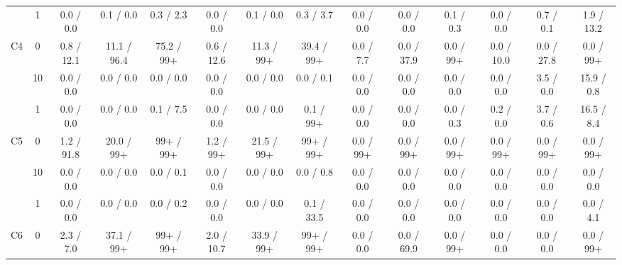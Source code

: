 \begin{table}
{\begin{tabular}[t]{cccccccccccccc}
\cmidrule{2-14}
 & 1 & 0.0 / 0.0 & 0.1 / 0.0 & 0.3 / 2.3 & 0.0 / 0.0 & 0.1 / 0.0 & 0.3 / 3.7 & 0.0 / 0.0 & 0.0 / 0.0 & 0.1 / 0.3 & 0.0 / 0.0 & 0.7 / 0.1 & 1.9 / 13.2\\
\cmidrule{2-14}
\multirow{-3}{*}{\centering\arraybackslash C4} & 0 & 0.8 / 12.1 & 11.1 / 96.4 & 75.2 / 99+ & 0.6 / 12.6 & 11.3 / 99+ & 39.4 / 99+ & 0.0 / 7.7 & 0.0 / 37.9 & 0.0 / 99+ & 0.0 / 10.0 & 0.0 / 27.8 & 0.0 / 99+\\
\cmidrule{1-14}
 & 10 & 0.0 / 0.0 & 0.0 / 0.0 & 0.0 / 0.0 & 0.0 / 0.0 & 0.0 / 0.0 & 0.0 / 0.1 & 0.0 / 0.0 & 0.0 / 0.0 & 0.0 / 0.0 & 0.0 / 0.0 & 3.5 / 0.0 & 15.9 / 0.8\\
\cmidrule{2-14}
 & 1 & 0.0 / 0.0 & 0.0 / 0.0 & 0.1 / 7.5 & 0.0 / 0.0 & 0.0 / 0.0 & 0.1 / 99+ & 0.0 / 0.0 & 0.0 / 0.0 & 0.0 / 0.3 & 0.2 / 0.0 & 3.7 / 0.6 & 16.5 / 8.4\\
\cmidrule{2-14}
\multirow{-3}{*}{\centering\arraybackslash C5} & 0 & 1.2 / 91.8 & 20.0 / 99+ & 99+ / 99+ & 1.2 / 99+ & 21.5 / 99+ & 99+ / 99+ & 0.0 / 99+ & 0.0 / 99+ & 0.0 / 99+ & 0.0 / 99+ & 0.0 / 99+ & 0.0 / 99+\\
\cmidrule{1-14}
 & 10 & 0.0 / 0.0 & 0.0 / 0.0 & 0.0 / 0.1 & 0.0 / 0.0 & 0.0 / 0.0 & 0.0 / 0.8 & 0.0 / 0.0 & 0.0 / 0.0 & 0.0 / 0.0 & 0.0 / 0.0 & 0.0 / 0.0 & 0.0 / 0.0\\
\cmidrule{2-14}
 & 1 & 0.0 / 0.0 & 0.0 / 0.0 & 0.0 / 0.2 & 0.0 / 0.0 & 0.0 / 0.0 & 0.1 / 33.5 & 0.0 / 0.0 & 0.0 / 0.0 & 0.0 / 0.0 & 0.0 / 0.0 & 0.0 / 0.0 & 0.0 / 4.1\\
\cmidrule{2-14}
\multirow{-3}{*}{\centering\arraybackslash C6} & 0 & 2.3 / 7.0 & 37.1 / 99+ & 99+ / 99+ & 2.0 / 10.7 & 33.9 / 99+ & 99+ / 99+ & 0.0 / 0.0 & 0.0 / 69.9 & 0.0 / 99+ & 0.0 / 0.0 & 0.0 / 0.0 & 0.0 / 99+\\
\bottomrule
\end{tabular}
}
\end{table}
